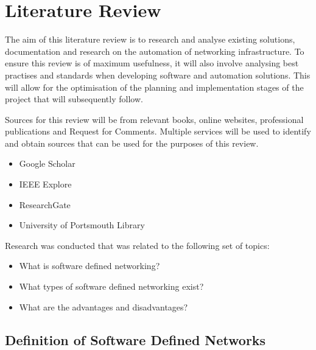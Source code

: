 \chapter{Literature Review}
\label{chap:litreview}
The aim of this literature review is to research and analyse existing
solutions, documentation and research on the automation of networking
infrastructure. To ensure this review is of maximum usefulness, it will also
involve analysing best practises and standards when developing software and
automation solutions. This will allow for the optimisation of the planning and
implementation stages of the project that will subsequently follow.

Sources for this review will be from relevant books, online websites,
professional publications and Request for Comments. Multiple services will be
used to identify and obtain sources that can be used for the purposes of this
review.
\begin{itemize}
    \item Google Scholar
    \item IEEE Explore
    \item ResearchGate
    \item University of Portsmouth Library
\end{itemize}
Research was conducted that was related to the following set of topics:
\begin{itemize}
    \item What is software defined networking?
    \item What types of software defined networking exist?
    \item What are the advantages and disadvantages?
\end{itemize}

\section{Definition of Software Defined Networks}
\label{litreview:definition}

